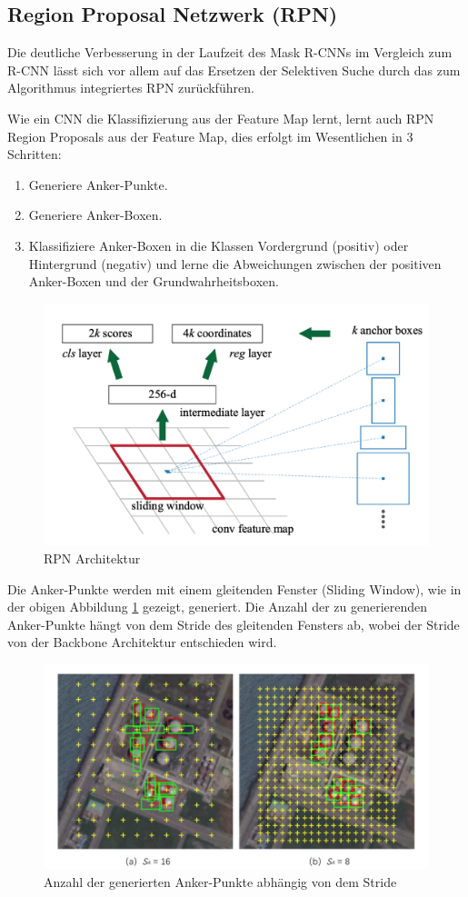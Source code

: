 \subsection{Region Proposal Netzwerk (RPN)} \label{subsec:RPN}
Die deutliche Verbesserung in der Laufzeit des Mask R-CNNs im Vergleich zum R-CNN lässt sich vor allem auf das Ersetzen der Selektiven Suche durch das zum Algorithmus integriertes RPN zurückführen. 

Wie ein CNN die Klassifizierung aus der Feature Map lernt, lernt auch RPN Region Proposals aus der Feature Map, dies erfolgt im Wesentlichen in 3 Schritten:

\begin{enumerate}
\item Generiere Anker-Punkte.
\item Generiere Anker-Boxen.
\item Klassifiziere Anker-Boxen in die Klassen Vordergrund (positiv) oder Hintergrund (negativ) und lerne die Abweichungen zwischen der positiven Anker-Boxen und der  Grundwahrheitsboxen.
\end{enumerate}

\begin{figure}[H]
\centering
\includegraphics[width=0.5\linewidth]{pic/Segmentierung/RPN_architektur.png}
\caption{\label{pic:rpn} RPN Architektur}
\end{figure}

Die Anker-Punkte werden mit einem gleitenden Fenster (Sliding Window), wie in der obigen Abbildung \ref{pic:rpn} gezeigt, generiert. Die Anzahl der zu generierenden Anker-Punkte hängt von dem Stride des gleitenden Fensters ab, wobei der Stride von der Backbone Architektur entschieden wird. 
\begin{figure}[H]
\centering
\includegraphics[width=0.7\linewidth]{pic/Segmentierung/Segmentierungsergebnisse/Anker-Punkte.png}
\caption{\label{pic:Anker-Punkte} Anzahl der generierten Anker-Punkte abhängig von dem Stride }
\end{figure}

